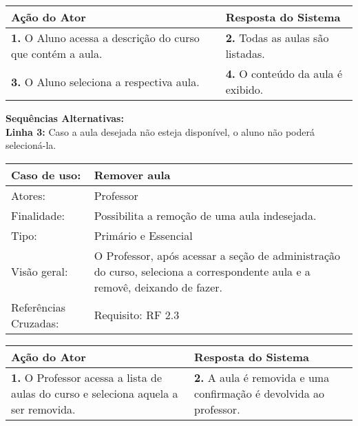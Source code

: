 \documentclass[12pt,a4paper,onecolumn,titlepage]{article}
\begin{document}
\begin{center}
\def\arraystretch{1.1}
\begin{tabular}{|p{6cm}|p{6cm}|}

\hline
\textbf{Ação do Ator} & \textbf{Resposta do Sistema} \\ \hline
\textbf{1.} O Aluno acessa a descrição do curso que contém a aula.  & \textbf{2.} Todas as aulas são listadas.\\ \hline
\textbf{3.} O Aluno seleciona a respectiva aula.  & \textbf{4.} O conteúdo da aula é exibido. \\ \hline
\end{tabular}
\end{center}

\textbf{Sequências Alternativas:} \\
\textbf{Linha 3:} Caso a aula desejada não esteja disponível, o aluno não poderá selecioná-la.

\newpage

\begin{table}[h!]
\begin{center}
\begin{tabular}{p{2.5cm} p{9.5cm}}
Caso de uso: & \textbf{Remover aula} \\ \hline
Atores: & Professor \\ \hline
Finalidade: & Possibilita a remoção de uma aula indesejada. \\ \hline
Tipo: & Primário e Essencial\\ \hline
Visão geral: & O Professor, após acessar a seção de administração do curso, seleciona a correspondente aula e a removê, deixando de fazer. \\ \hline
Referências Cruzadas: & Requisito: RF 2.3

\end{tabular}
\end{center}
\end{table}

\begin{center}
\def\arraystretch{1.1}
\begin{tabular}{|p{6cm}|p{6cm}|}

\hline
\textbf{Ação do Ator} & \textbf{Resposta do Sistema} \\ \hline
\textbf{1.} O Professor acessa a lista de aulas do curso e seleciona aquela a ser removida.  &  \textbf{2.} A aula é removida e uma confirmação é devolvida ao professor.\\ \hline

\end{tabular}
\end{center}
\end{document}
